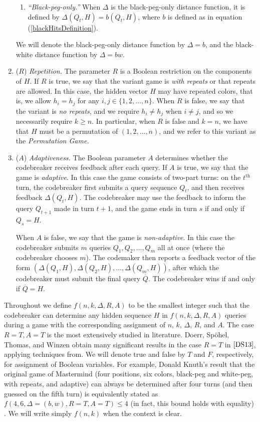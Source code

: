 \documentclass[12pt, a4paper]{article}
\newcommand{\nth}{^{\text{th}}}       %
\begin{document}
\begin{enumerate}[label=(\roman*)]
\begin{enumerate}[label=\alph*.]
		\item\textit{``Black-peg-only.''} When $\Delta$ is the black-peg-only distance function, it is defined by $\Delta(Q_t, H) = b(Q_t, H)$, where $b$ is defined as in equation (\ref{blackHitsDefinition}).
	\end{enumerate}
	We will denote the black-peg-only distance function by $\Delta = b$, and the black-white distance function by $\Delta = bw$.
	
	\item($R$) \textit{Repetition.} The parameter $R$ is a Boolean restriction on the components of $H$. If $R$ is true, we say that the variant game is \textit{with repeats} or that repeats are allowed. In this case, the hidden vector $H$ may have repeated colors, that is, we allow $h_i = h_j$ for any $i,j\in\{1,2,\ldots, n\}$. When $R$ is false, we say that the variant is \textit{no repeats}, and we require $h_i\neq h_j$ when $i\neq j$, and so we necessarily require $k \geq n$. In particular, when $R$ is false and $k = n$, we have that $H$ must be a permutation of $(1, 2, \ldots, n)$, and we refer to this variant as the \textit{Permutation Game.}
	
	\item($A$) \textit{Adaptiveness.} The Boolean parameter $A$ determines whether the codebreaker receives feedback after each query. If $A$ is true, we say that the game is \textit{adaptive}. In this case the game consists of two-part turns: on the $t\nth$ turn, the codebreaker first submits a query sequence $Q_t$, and then receives feedback $\Delta(Q_t, H)$. The codebreaker may use the feedback to inform the query $Q_{t+1}$ made in turn $t+1$, and the game ends in turn $s$ if and only if $Q_s = H$.
	
	When $A$ is false, we say that the game is \textit{non-adaptive}. In this case the codebreaker submits $m$ queries $Q_1, Q_2, \ldots, Q_m$ all at once (where the codebreaker chooses $m$). The codemaker then reports a feedback vector of the form $(\Delta(Q_1, H), \Delta(Q_2, H), \ldots, \Delta(Q_m, H))$, after which the codebreaker must submit the final query $\overline{Q}$. The codebreaker wins if and only if $\overline{Q} = H$.
\end{enumerate}

Throughout we define $f(n, k, \Delta, R, A)$ to be the smallest integer such that the codebreaker can determine any hidden sequence $H$ in $f(n, k, \Delta, R, A)$ queries during a game with the corresponding assignment of $n$, $k$, $\Delta$, $R$, and $A$. The case $R = T, A = T$ is the most extensively studied in literature. Doerr, Sp\"ohel, Thomas, and Winzen obtain many significant results in the case $R = T$ in $\cite{DS13}$, applying techniques from. We will denote true and false by $T$ and $F$, respectively, for assignment of Boolean variables. For example, Donald Knuth's result that the original game of Mastermind (four positions, six colors, black-peg and white-peg, with repeats, and adaptive) can always be determined after four turns (and then guessed on the fifth turn) is equivalently stated as $f(4, 6, \Delta = (b,w), R=T, A=T)\le 4$ (in fact, this bound holds with equality) \cite{DK76}. We will write simply $f(n, k)$ when the context is clear.
\end{document}
